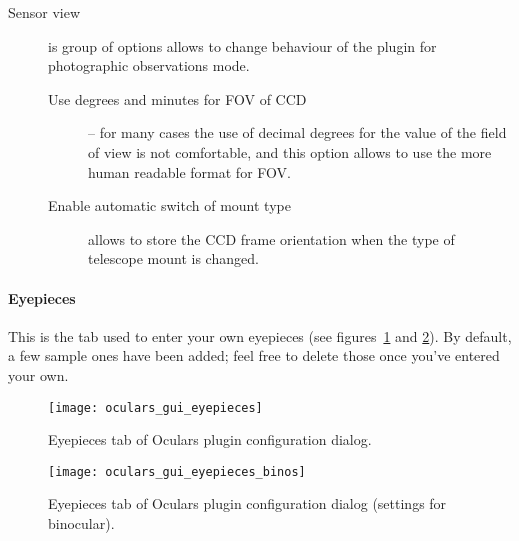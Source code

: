\begin{description}
\item[Sensor view] is group of options allows to change behaviour of the plugin for photographic observations mode.
 \begin{description}
   \item[Use degrees and minutes for FOV of CCD] -- for many cases the use of decimal degrees for the value of the field of view is not comfortable, and this option allows to use the more human readable format for FOV.
   \item[Enable automatic switch of mount type] allows to store the CCD frame orientation when the type of telescope mount is changed.
 \end{description}
\end{description}

\paragraph{Eyepieces}

This is the tab used to enter your own eyepieces (see figures~\ref{fig:plugins:Oculars:Gui:Eyepieces} and \ref{fig:plugins:Oculars:Gui:Eyepieces_binos}). 
By default, a few sample ones have been added; feel free to delete those once you've entered your own.

\begin{figure}[p]\centering
\texttt{[image: oculars\_gui\_eyepieces]}
\caption{Eyepieces tab of Oculars plugin configuration dialog.}
\label{fig:plugins:Oculars:Gui:Eyepieces}
\end{figure}

\begin{figure}[p]\centering
\texttt{[image: oculars\_gui\_eyepieces\_binos]}
\caption{Eyepieces tab of Oculars plugin configuration dialog (settings for binocular).}
\label{fig:plugins:Oculars:Gui:Eyepieces_binos}
\end{figure}


